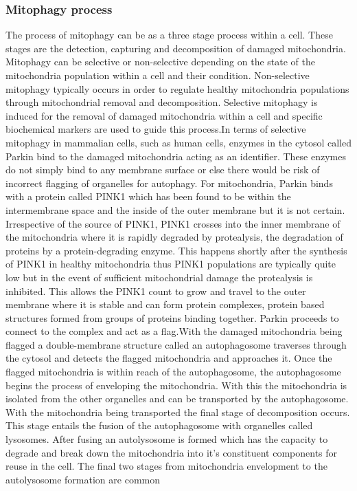\subsubsection{Mitophagy process}
The process of mitophagy can be as a three stage process within a cell. These stages are the detection, capturing and decomposition of damaged mitochondria. Mitophagy can be selective or non-selective depending on the state of the mitochondria population within a cell and their condition. Non-selective mitophagy typically occurs in order to regulate healthy mitochondria populations through mitochondrial removal and decomposition. Selective mitophagy is induced for the removal of damaged mitochondria within a cell and specific biochemical markers are used to guide this process.\newline\newline In terms of selective mitophagy in mammalian cells, such as human cells, enzymes in the cytosol called Parkin bind to the damaged mitochondria acting as an identifier. These enzymes do not simply bind to any membrane surface or else there would be risk of incorrect flagging of organelles for autophagy. For mitochondria, Parkin binds with a protein called PINK1 which has been found to be within the intermembrane space and the inside of the outer membrane but it is not certain. Irrespective of the source of PINK1, PINK1 crosses into the inner membrane of the mitochondria where it is rapidly degraded by protealysis, the degradation of proteins by a protein-degrading enzyme. This happens shortly after the synthesis of PINK1 in healthy mitochondria thus PINK1 populations are typically quite low but in the event of sufficient mitochondrial damage the protealysis is inhibited. This allows the PINK1 count to grow and travel to the outer membrane where it is stable and can form protein complexes, protein based structures formed from groups of proteins binding together. Parkin proceeds to connect to the complex and act as a flag.\newline\newline With the damaged mitochondria being flagged a double-membrane structure called an autophagosome traverses through the cytosol and detects the flagged mitochondria and approaches it. Once the flagged mitochondria is within reach of the autophagosome, the autophagosome begins the process of enveloping the mitochondria. With this the mitochondria is isolated from the other organelles and can be transported by the autophagosome. With the mitochondria being transported the final stage of decomposition occurs. This stage entails the fusion of the autophagosome with organelles called lysosomes. After fusing an autolysosome is formed which has the capacity to degrade and break down the mitochondria into it's constituent components for reuse in the cell. The final two stages from mitochondria envelopment to the autolysosome formation are common 
